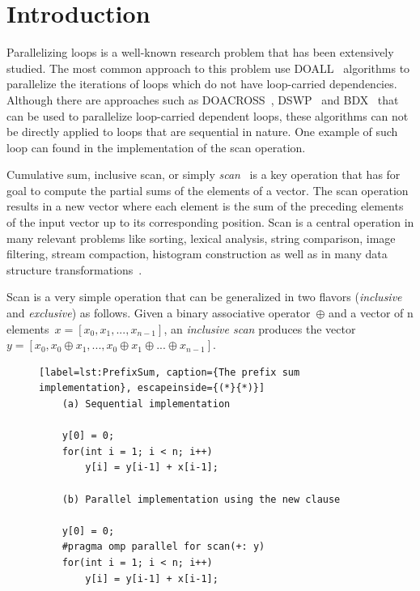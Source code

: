 \documentclass[Ingles]{ic-tese-v1}
\begin{document}
\fimdaspaginasiniciais


\chapter{Introduction}
\label{cap:Introduction}

Parallelizing loops  is a  well-known research  problem that  has been
extensively  studied. The  most common  approach to  this problem  use
DOALL~\cite{Lamport:1974} algorithms  to parallelize
the iterations of  loops which do not  have loop-carried dependencies.
Although  there  are   approaches  such  as  DOACROSS~\cite{doacross},
DSWP~\cite{Rangan:2004} and  BDX~\cite{Cesar:2015} that
can be  used to parallelize loop-carried dependent  loops, these algorithms
can  not  be  directly  applied   to  loops  that  are  sequential  in
nature. One  example of such loop  can found in the  implementation of
the scan operation.

Cumulative     sum,     inclusive     scan,     or     simply     {\it
	scan}~\cite{ScanAsPrimitive} is  a key operation that  has for goal
to compute  the partial  sums of  the elements of  a vector.  The scan
operation results in a new vector where each element is the sum of the
preceding  elements  of  the  input vector  up  to  its  corresponding
position. Scan is a central operation in many  relevant  problems  like  sorting,  
lexical  analysis,  string comparison,  image  filtering, stream compaction, 
histogram construction as well as  in many data
structure transformations~\cite{BlellochTR90}.

Scan  is a very simple  operation  that can  be generalized  
in two flavors (\textit{inclusive} and \textit{exclusive}) as follows.   
Given  a binary  associative  operator\  $\oplus$ and  a
vector of  n elements\ $x = [x_{0},  x_{1}, ...  ,x_{n-1}]$,
an   {\em    inclusive   scan}    produces   the    vector
$y =  [ x_{0}, x_{0}  \oplus x_{1},  ... ,x_{0} \oplus  x_{1} \oplus
... \oplus x_{n-1}]$. 

\begin{figure}[t]
	\lstset{basicstyle=\scriptsize}
	\begin{lstlisting}[label=lst:PrefixSum, caption={The prefix sum implementation}, escapeinside={(*}{*)}]
	(a) Sequential implementation
	
	y[0] = 0;
	for(int i = 1; i < n; i++)
		y[i] = y[i-1] + x[i-1];
	
	(b) Parallel implementation using the new clause
	
	y[0] = 0;
	#pragma omp parallel for scan(+: y)
	for(int i = 1; i < n; i++)
		y[i] = y[i-1] + x[i-1];
	\end{lstlisting}
	\vspace{-0.7cm}
\end{figure}
\end{document}
